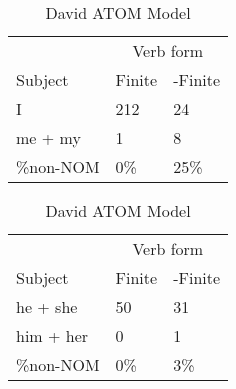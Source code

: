 \begin{table}[]
    \caption{David ATOM Model}
    \begin{minipage}{0.5\textwidth}
    \centering
    \begin{tabular}{@{}lll@{}}
        \toprule
         &\multicolumn{2}{c}{Verb form}\\
         \cline{2-3}
        Subject & Finite & -Finite \\
        \midrule
        I & 212 & 24 \\
        me + my & 1 & 8 \\
        \hline
        \%non-NOM & 0\% & 25\% \\
        \bottomrule
    \end{tabular}
\end{minipage}
\begin{minipage}{0.5\textwidth}
    \centering
    \begin{tabular}{@{}lll@{}}
        \toprule
         &\multicolumn{2}{c}{Verb form}\\
         \cline{2-3}
        Subject & Finite & -Finite \\
        \midrule
        he + she & 50 & 31 \\
        him + her & 0 & 1 \\
        \hline
        \%non-NOM & 0\% & 3\% \\
        \bottomrule
    \end{tabular}
    \end{minipage}
    \begin{minipage}{0.5\textwidth}
    

\end{minipage}
\end{table}
